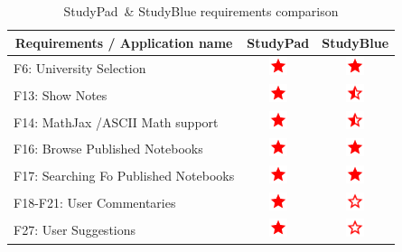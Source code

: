 \documentclass[thesis=B,english]{FITthesis}[2012/10/20]
\newcommand{\appname}{StudyPad}
\newcommand{\present}{\begin{minipage}{.1\textwidth}
\centering
      \includegraphics[width=15pt, height=15pt]{ic_star_black_24dp}
    \end{minipage}}
\newcommand{\limited}{\begin{minipage}{.1\textwidth}
\centering
      \includegraphics[width=15pt, height=15pt]{ic_star_half_black_24dp}
    \end{minipage}}
\newcommand{\absent}{\begin{minipage}{.1\textwidth}
\centering
      \includegraphics[width=15pt, height=15pt]{ic_star_border_black_24dp}
    \end{minipage}}
\begin{document}
\begin{table}[H]
\caption{\appname\ \& StudyBlue requirements comparison}
\label{tab:studyblue}
\begin{tabular}{|l|c|c|}
\hline
\multicolumn{1}{|c|}{\textbf{Requirements / Application name}} & \multicolumn{1}{l|}{\textbf{StudyPad}} & \multicolumn{1}{l|}{\textbf{StudyBlue}} \\ \hline
F6: University Selection                                       & \present                                & \present                                \\ \hline
F13: Show Notes                                                & \present                              & \limited                                \\ \hline
F14: MathJax /ASCII Math support                               & \present                               & \limited                                \\ \hline
F16: Browse Published Notebooks                        & \present                                & \present                               \\ \hline
F17: Searching Fo Published Notebooks                    & \present                                & \present                               \\ \hline
F18-F21: User Commentaries                                     & \present                                & \absent                                \\ \hline
F27: User Suggestions                                          & \present                                & \absent                               \\ \hline
\end{tabular}
\end{table}
\end{document}
